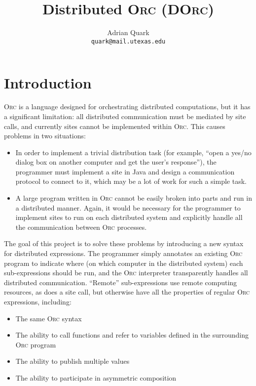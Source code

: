 \documentclass[10pt,letterpaper]{article}
\begin{document}
\title{Distributed \textsc{Orc} (\textsc{DOrc})}

\author{Adrian Quark\\
{\tt\small quark@mail.utexas.edu}}

\maketitle

\section{Introduction}

\textsc{Orc} is a language designed for orchestrating distributed computations,
but it has a significant limitation: all distributed communication must be
mediated by site calls, and currently sites cannot be implemented within
\textsc{Orc}.  This causes problems in two situations:
\begin{itemize}
\item In order to implement a trivial distribution task (for example, ``open a
yes/no dialog box on another computer and get the user's response''), the
programmer must implement a site in Java and design a communication protocol to
connect to it, which may be a lot of work for such a simple task.
\item A large program written in \textsc{Orc} cannot be easily broken into
parts and run in a distributed manner. Again, it would be necessary for the
programmer to implement sites to run on each distributed system and explicitly
handle all the communication between \textsc{Orc} processes.
\end{itemize}

The goal of this project is to solve these problems by introducing a new syntax
for distributed expressions. The programmer simply annotates an existing
\textsc{Orc} program to indicate where (on which computer in the distributed
system) each sub-expressions should be run, and the \textsc{Orc} interpreter
transparently handles all distributed communication. ``Remote'' sub-expressions
use remote computing resources, as does a site call, but otherwise have all the
properties of regular \textsc{Orc} expressions, including:
\begin{itemize}
\item The same \textsc{Orc} syntax
\item The ability to call functions and refer to variables defined in the
surrounding \textsc{Orc} program
\item The ability to publish multiple values
\item The ability to participate in asymmetric composition
\end{itemize}
\end{document}
